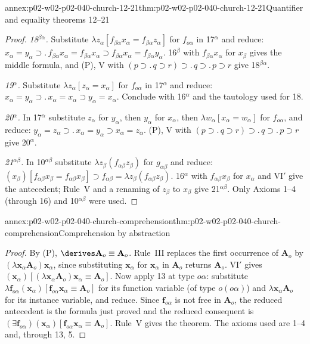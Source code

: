 \begin{annexitem}{annex:p02-w02-p02-040-church-12-21}{thm:p02-w02-p02-040-church-12-21}{Quantifier and equality theorems 12--21}
\begin{proof}
\emph{18\(^{\beta\alpha}\).}  Substitute
\(\lambda z_\alpha[f_{\beta\alpha}x_\alpha=f_{\beta\alpha}z_\alpha]\) for
\(f_{o\alpha}\) in 17\(^\alpha\) and reduce:
\(x_\alpha=y_\alpha\supset.\,f_{\beta\alpha}x_\alpha=f_{\beta\alpha}x_\alpha\supset f_{\beta\alpha}x_\alpha=f_{\beta\alpha}y_\alpha\).
16\(^\beta\) with \(f_{\beta\alpha}x_\alpha\) for \(x_\beta\) gives the middle
formula, and (P), V with
\((p\supset.\,q\supset r)\supset.\,q\supset.\,p\supset r\) give 18\(^{\beta\alpha}\).

\emph{19\(^\alpha\).}  Substitute \(\lambda z_\alpha[z_\alpha=x_\alpha]\) for
\(f_{o\alpha}\) in 17\(^\alpha\) and reduce:
\(x_\alpha=y_\alpha\supset.\,x_\alpha=x_\alpha\supset y_\alpha=x_\alpha\).
Conclude with 16\(^\alpha\) and the tautology used for 18.

\emph{20\(^\alpha\).}  In 17\(^\alpha\) substitute \(z_\alpha\) for \(y_\alpha\),
then \(y_\alpha\) for \(x_\alpha\), then
\(\lambda w_\alpha[x_\alpha=w_\alpha]\) for \(f_{o\alpha}\), and reduce:
\(y_\alpha=z_\alpha\supset.\,x_\alpha=y_\alpha\supset x_\alpha=z_\alpha\).
(P), V with \((p\supset.\,q\supset r)\supset.\,q\supset.\,p\supset r\)
give 20\(^\alpha\).

\emph{21\(^{\alpha\beta}\).}  In 10\(^{\alpha\beta}\) substitute
\(\lambda z_\beta(f_{\alpha\beta}z_\beta)\) for \(g_{\alpha\beta}\) and reduce:
\((x_\beta)[f_{\alpha\beta}x_\beta=f_{\alpha\beta}x_\beta]\supset f_{\alpha\beta}=\lambda z_\beta(f_{\alpha\beta}z_\beta)\).
16\(^\alpha\) with \(f_{\alpha\beta}x_\beta\) for \(x_\alpha\) and VI\('\) give the
antecedent; Rule~V and a renaming of \(z_\beta\) to \(x_\beta\) give
21\(^{\alpha\beta}\).  Only Axioms 1--4 (through 16) and 10\(^{\alpha\beta}\)
were used.
\end{proof}
\end{annexitem}

\begin{annexitem}{annex:p02-w02-p02-040-church-comprehension}{thm:p02-w02-p02-040-church-comprehension}{Comprehension by abstraction}
\begin{proof}
By (P), \(\derives\mathbf A_o\equiv\mathbf A_o\).  Rule~III replaces the first
occurrence of \(\mathbf A_o\) by \((\lambda\mathbf x_\alpha\mathbf A_o)\mathbf x_\alpha\),
since substituting \(\mathbf x_\alpha\) for \(\mathbf x_\alpha\) in
\(\mathbf A_o\) returns \(\mathbf A_o\).  VI\('\) gives
\((\mathbf x_\alpha)[(\lambda\mathbf x_\alpha\mathbf A_o)\mathbf x_\alpha\equiv\mathbf A_o]\).
Now apply 13 at type \(o\alpha\): substitute
\(\lambda\mathbf f_{o\alpha}(\mathbf x_\alpha)[\mathbf f_{o\alpha}\mathbf x_\alpha\equiv\mathbf A_o]\)
for its function variable (of type \(o(o\alpha)\)) and
\(\lambda\mathbf x_\alpha\mathbf A_o\) for its instance variable, and reduce.
Since \(\mathbf f_{o\alpha}\) is not free in \(\mathbf A_o\), the
reduced antecedent is the formula just proved and the reduced consequent is
\((\exists\mathbf f_{o\alpha})(\mathbf x_\alpha)[\mathbf f_{o\alpha}\mathbf x_\alpha\equiv\mathbf A_o]\).
Rule~V gives the theorem.  The axioms used are 1--4 and, through 13, 5.
\end{proof}
\end{annexitem}

